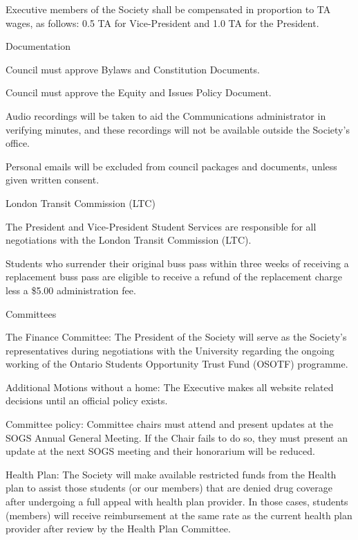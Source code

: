 \begin{longenum}[label*=\thesection.\arabic*., align=left]
\begin{longenum}[label*=\arabic*., align=left]
\begin{longenum}[label*=\arabic*., align=left]
\item Executive members of the Society shall be compensated in proportion to TA wages, as follows: 0.5 TA for Vice-President and 1.0 TA for the President.
\end{longenum}
\item Documentation
\begin{longenum}[label*=\arabic*., align=left]
\item Council must approve Bylaws and Constitution Documents.
\item Council must approve the Equity and Issues Policy Document.
\item Audio recordings will be taken to aid the Communications administrator in verifying minutes, and these recordings will not be available outside the Society's office.
\item Personal emails will be excluded from council packages and documents, unless given written consent.
\end{longenum}
\item London Transit Commission (LTC)
\begin{longenum}[label*=\arabic*., align=left]
\item The President and Vice-President Student Services are responsible for all negotiations with the London Transit Commission (LTC).
\item Students who surrender their original buss pass within three weeks of receiving a replacement buss pass are eligible to receive a refund of the replacement charge less a \$5.00 administration fee.
\end{longenum}
\item Committees
\begin{longenum}[label*=\arabic*., align=left]
\item The Finance Committee: The President of the Society will serve as the Society's representatives during negotiations with the University regarding the ongoing working of the Ontario Students Opportunity Trust Fund (OSOTF) programme.
\item Additional Motions without a home: The Executive makes all website related decisions until an official policy exists.
\item Committee policy: Committee chairs must attend and present updates at the SOGS Annual General Meeting. If the Chair fails to do so, they must present an update at the next SOGS meeting and their honorarium will be reduced.
\item Health Plan: The Society will make available restricted funds from the Health plan to assist those students (or our members) that are denied drug coverage after undergoing a full appeal with health plan provider. In those cases, students (members) will receive reimbursement at the same rate as the current health plan provider after review by the Health Plan Committee.

\end{longenum}
\end{longenum}
\end{longenum}

